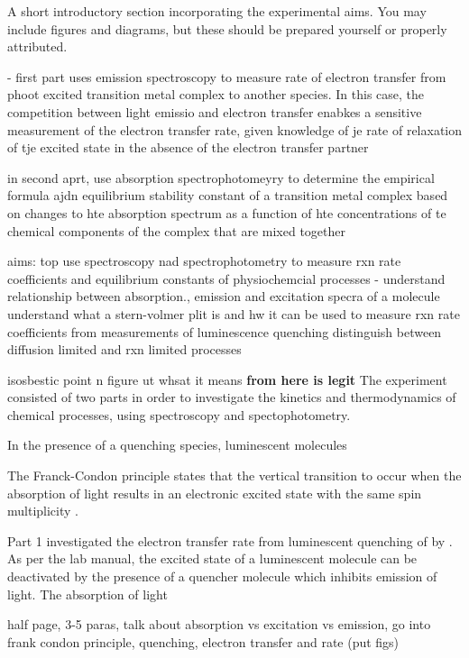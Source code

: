 A short introductory section incorporating the experimental aims. You may include figures and diagrams, but
these should be prepared yourself or properly attributed.


- first part uses emission spectroscopy to measure rate of electron transfer from phoot excited transition metal complex to another species. In this case, the competition between light emissio  and electron transfer enabkes a sensitive measurement of the electron transfer rate, given knowledge of je rate of relaxation of tje excited state in the absence of the electron transfer partner

in second aprt, use absorption spectrophotomeyry to determine the empirical formula ajdn equilibrium stability constant of a transition metal complex based on changes to hte absorption spectrum as a function of hte concentrations of te chemical components of the complex that are mixed together

aims: top use spectroscopy nad spectrophotometry to measure rxn rate coefficients and equilibrium constants of physiochemcial processes
- understand relationship between absorption., emission and excitation specra of a molecule
understand what a stern-volmer plit is and hw it can be used to measure rxn rate coefficients from measurements of luminescence quenching
distinguish between diffusion limited and rxn limited processes

isosbestic point n figure ut whsat it means
\textbf{from here is legit}
The experiment consisted of two parts in order to investigate the kinetics and thermodynamics of chemical processes, using spectroscopy and spectophotometry.

In the presence of a quenching species, luminescent molecules 

The Franck-Condon principle states that the vertical transition to occur when the absorption of light results in an electronic excited state with the same spin multiplicity \autocite{frank_condon}.

Part 1 investigated the electron transfer rate from luminescent quenching of  by . As per the lab manual\autocite{lab_manual}, the excited state of a luminescent molecule can be deactivated by the presence of a quencher molecule which inhibits emission of light. The absorption of light 


half page, 3-5 paras, talk about absorption vs excitation vs emission, go into frank condon principle, quenching, electron transfer and rate (put figs)